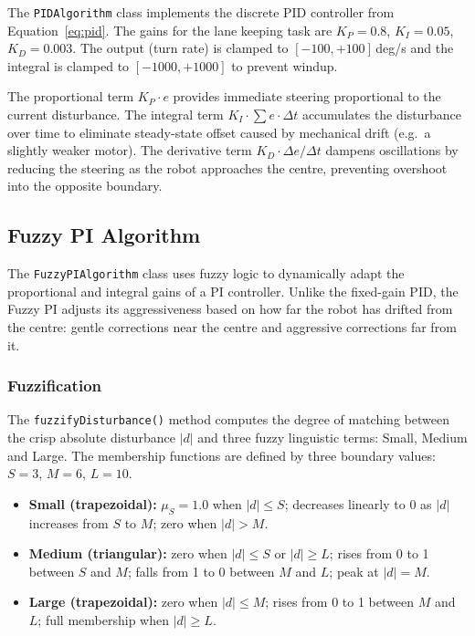The \texttt{PIDAlgorithm} class implements the discrete PID controller from Equation~\ref{eq:pid}. The gains for the lane keeping task are $K_P = 0.8$, $K_I = 0.05$, $K_D = 0.003$. The output (turn rate) is clamped to $[-100, +100]$\,deg/s and the integral is clamped to $[-1000, +1000]$ to prevent windup.

The proportional term $K_P \cdot e$ provides immediate steering proportional to the current disturbance. The integral term $K_I \cdot \sum e \cdot \Delta t$ accumulates the disturbance over time to eliminate steady-state offset caused by mechanical drift (e.g.\ a slightly weaker motor). The derivative term $K_D \cdot \Delta e / \Delta t$ dampens oscillations by reducing the steering as the robot approaches the centre, preventing overshoot into the opposite boundary.


\subsection{Fuzzy PI Algorithm}
\label{sec:fuzzy-pi}

The \texttt{FuzzyPIAlgorithm} class uses fuzzy logic to dynamically adapt the proportional and integral gains of a PI controller. Unlike the fixed-gain PID, the Fuzzy PI adjusts its aggressiveness based on how far the robot has drifted from the centre: gentle corrections near the centre and aggressive corrections far from it.

\subsubsection{Fuzzification}

The \texttt{fuzzifyDisturbance()} method computes the degree of matching between the crisp absolute disturbance $|d|$ and three fuzzy linguistic terms: Small, Medium and Large. The membership functions are defined by three boundary values: $S = 3$, $M = 6$, $L = 10$.

\begin{itemize}
    \item \textbf{Small (trapezoidal):} $\mu_S = 1.0$ when $|d| \le S$; decreases linearly to 0 as $|d|$ increases from $S$ to $M$; zero when $|d| > M$.
    \item \textbf{Medium (triangular):} zero when $|d| \le S$ or $|d| \ge L$; rises from 0 to 1 between $S$ and $M$; falls from 1 to 0 between $M$ and $L$; peak at $|d| = M$.
    \item \textbf{Large (trapezoidal):} zero when $|d| \le M$; rises from 0 to 1 between $M$ and $L$; full membership when $|d| \ge L$.
\end{itemize}

